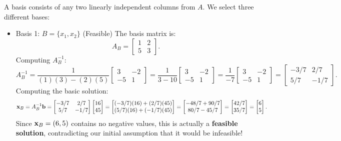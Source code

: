 A basis consists of any two linearly independent columns from \( A \). We select three different bases:
\begin{itemize}
\item  Basis 1: \(B= \{x_1, x_2\} \) (Feasible)
The basis matrix is:
\[
A_B =
\begin{bmatrix}
    1 & 2 \\
    5 & 3
\end{bmatrix}.
\]
Computing \( A_B^{-1} \):
\[
A_B^{-1} =
\frac{1}{(1)(3) - (2)(5)}
\begin{bmatrix}
    3 & -2 \\
    -5 & 1
\end{bmatrix}
=
\frac{1}{3 - 10}
\begin{bmatrix}
    3 & -2 \\
    -5 & 1
\end{bmatrix}
=
\frac{1}{-7}
\begin{bmatrix}
    3 & -2 \\
    -5 & 1
\end{bmatrix}
=
\begin{bmatrix}
    -3/7 & 2/7 \\
    5/7 & -1/7
\end{bmatrix}.
\]
Computing the basic solution:
\[
\mathbf{x}_B = A_B^{-1}\mathbf{b}=
\begin{bmatrix}
    -3/7 & 2/7 \\
    5/7 & -1/7
\end{bmatrix}
\begin{bmatrix}
    16 \\ 45
\end{bmatrix}
=
\begin{bmatrix}
    (-3/7)(16) + (2/7)(45) \\
    (5/7)(16) + (-1/7)(45)
\end{bmatrix}
=
\begin{bmatrix}
    -48/7 + 90/7 \\
    80/7 - 45/7
\end{bmatrix}
=
\begin{bmatrix}
    42/7 \\
    35/7
\end{bmatrix}
=
\begin{bmatrix}
    6 \\ 5
\end{bmatrix}.
\]
Since \( \mathbf{x}_B = (6,5) \) contains no negative values, this is actually a \textbf{feasible solution}, contradicting our initial assumption that it would be infeasible!


\end{itemize}
